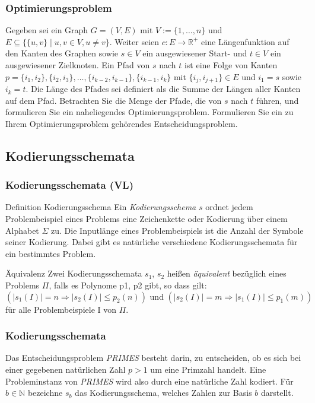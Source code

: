 \documentclass{beamer}
\begin{document}
{\begin{frame}
 \frametitle{Optimierungsproblem}
 Gegeben sei ein Graph $G=(V,E)$ mit $V:=\{1,\ldots,n\}$ und $E\subseteq \{\{u,v\} \mid u,v \in V, u\neq v\}$. Weiter seien $c:E \rightarrow \mathbb{R}^+$ eine Längenfunktion auf den Kanten des Graphen sowie $s\in V$ ein ausgewiesener Start- und $t\in V$ ein ausgewiesener Zielknoten. 
Ein Pfad von $s$ nach $t$ ist eine Folge von Kanten $p = \{i_1,i_2\},\{i_2,i_3\},\ldots,\{i_{k-2},i_{k-1}\},\{i_{k-1},i_k\}$ mit $\{i_j, i_{j+1}\} \in E$ und $i_1=s$ sowie $i_k=t$. 
Die Länge des Pfades sei definiert als die Summe der Längen aller Kanten auf dem Pfad. 
Betrachten Sie die Menge der Pfade, die von $s$ nach $t$ führen, und formulieren Sie ein naheliegendes Optimierungsproblem. 
Formulieren Sie ein zu Ihrem Optimierungsproblem gehörendes Entscheidungsproblem.
\end{frame}

\subsection{Kodierungsschemata}
\begin{frame}
 \frametitle{Kodierungsschemata (VL)}
 \begin{block}{Definition Kodierungsschema}
 Ein \emph{Kodierungsschema} $s$ ordnet jedem Problembeispiel eines Problems eine Zeichenkette oder Kodierung über einem Alphabet $\Sigma$ zu. 
 Die Inputlänge eines Problembeispiels ist die Anzahl der Symbole seiner Kodierung.
 Dabei gibt es natürliche verschiedene Kodierungsschemata für ein bestimmtes Problem.
 \end{block}
 \begin{block}{Äquivalenz}
  Zwei Kodierungsschemata $s_1$, $s_2$ heißen \emph{äquivalent} bezüglich eines Problems $\Pi$, falls es Polynome p1, p2 gibt, so dass gilt:
  \[
   (|s_1(I)| = n \Rightarrow |s_2(I)| \leq p_2(n))\mbox{ und } (|s_2(I)| = m \Rightarrow |s_1(I)| \leq p_1(m))
  \]
für alle Problembeispiele I von $\Pi$.
 \end{block}
\end{frame}

\begin{frame}
 \frametitle{Kodierungsschemata}
 Das Entscheidungsproblem \textit{PRIMES} besteht darin, zu entscheiden, ob es sich bei einer gegebenen natürlichen Zahl $p>1$ um eine Primzahl handelt. 
Eine Probleminstanz von \textit{PRIMES} wird also durch eine natürliche Zahl kodiert. 
Für $b\in \mathbb{N}$ bezeichne $s_b$ das Kodierungsschema, welches Zahlen zur Basis $b$ darstellt.


\end{frame}}
\end{document}
